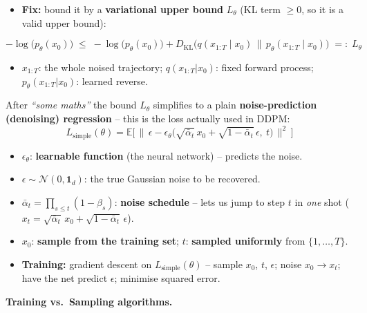 \documentclass[10pt,a4paper]{article}
\begin{document}
	\begin{itemize}[leftmargin=*]
		\item \textbf{Fix:} bound it by a \textbf{variational upper bound} $L_\theta$ (KL term $\ge 0$, so it is a valid upper bound):
	\end{itemize}
	\begin{formulabox}
		\[
			-\log\big(p_\theta(x_0)\big) \;\le\;
			-\log\big(p_\theta(x_0)\big) + D_{\mathrm{KL}}\!\big(q(x_{1:T}\mid x_0)\,\|\,p_\theta(x_{1:T}\mid x_0)\big)
			\;=:\; L_\theta
		\]
	\end{formulabox}
	\begin{itemize}[leftmargin=*]
		\item $x_{1:T}$: the whole noised trajectory; $q(x_{1:T}|x_0)$: fixed forward process; $p_\theta(x_{1:T}|x_0)$: learned reverse.
	\end{itemize}

	\begin{importantbox}
		After \emph{``some maths''} the bound $L_\theta$ simplifies to a plain \textbf{noise-prediction (denoising) regression} -- this is the loss actually used in DDPM:
		\[
			L_{\text{simple}}(\theta) =
			\mathbb{E}\Big[\,\big\|\,\epsilon - \epsilon_\theta\big(\sqrt{\bar\alpha_t}\,x_0 + \sqrt{1-\bar\alpha_t}\,\epsilon,\ t\big)\,\big\|^2\,\Big]
		\]
	\end{importantbox}
	\begin{itemize}[leftmargin=*]
		\item $\epsilon_\theta$: \textbf{learnable function} (the neural network) -- predicts the noise.
		\item $\epsilon \sim \mathcal{N}(0,\mathbf{1}_d)$: the true Gaussian noise to be recovered.
		\item $\bar\alpha_t = \prod_{s\le t}(1-\beta_s)$: \textbf{noise schedule} -- lets us jump to step $t$ in \emph{one} shot ($x_t=\sqrt{\bar\alpha_t}\,x_0+\sqrt{1-\bar\alpha_t}\,\epsilon$).
		\item $x_0$: \textbf{sample from the training set}; \quad $t$: \textbf{sampled uniformly} from $\{1,\dots,T\}$.
	\end{itemize}
	\begin{itemize}[leftmargin=*]
		\item \textbf{Training:} gradient descent on $L_{\text{simple}}(\theta)$ -- sample $x_0$, $t$, $\epsilon$; noise $x_0\to x_t$; have the net predict $\epsilon$; minimise squared error.
	\end{itemize}

	\medskip
	\textbf{Training vs.\ Sampling algorithms.}
\end{document}

